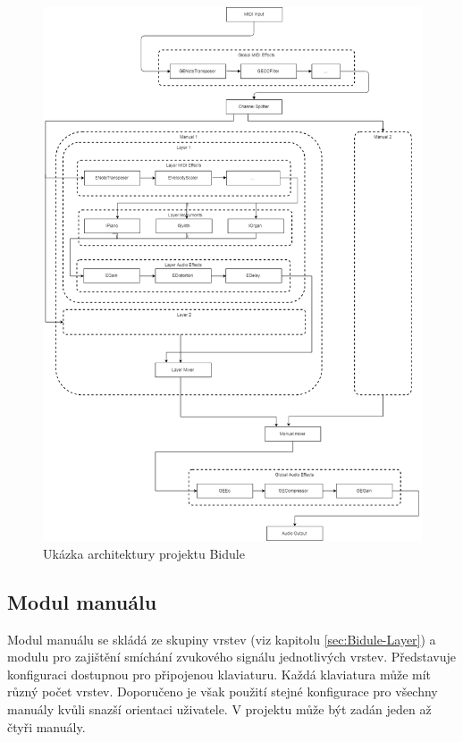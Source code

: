 \documentclass[thesis=M,czech]{FITthesis}[2019/03/06]
\begin{document}
		\begin{figure}
			\centering
			\includegraphics[width=1\textwidth]{BiduleComponents}
			\caption{Ukázka architektury projektu Bidule}\label{fig:BiduleComponents}
		\end{figure}
			
		\subsection{Modul manuálu}\label{sec:Bidule-Manual}
			Modul manuálu se skládá ze skupiny vrstev (viz kapitolu \ref{sec:Bidule-Layer}) a modulu pro zajištění smíchání zvukového signálu
			jednotlivých vrstev. Představuje konfiguraci dostupnou pro připojenou klaviaturu. Každá klaviatura může mít různý počet
			vrstev. Doporučeno je však použití stejné konfigurace pro všechny manuály kvůli snazší orientaci uživatele.
			V projektu může být zadán jeden až čtyři manuály.
\end{document}
